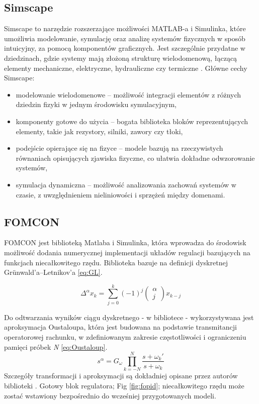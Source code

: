 \documentclass[journal,twoside,web]{ieeecolor}
\begin{document}
\subsection{Simscape}
Simscape to narzędzie rozszerzające możliwości MATLAB-a i Simulinka, które umożliwia modelowanie, symulację oraz analizę systemów fizycznych w sposób intuicyjny, za pomocą komponentów graficznych. Jest szczególnie przydatne w dziedzinach, gdzie systemy mają złożoną strukturę wielodomenową, łączącą elementy mechaniczne, elektryczne, hydrauliczne czy termiczne \href{https://www.mathworks.com/help/robotics/}{\cite{Simscape}}. Główne cechy Simscape:
\begin{itemize}
	\item modelowanie wielodomenowe – możliwość integracji elementów z różnych dziedzin fizyki w jednym środowisku symulacyjnym,
	\item komponenty gotowe do użycia – bogata biblioteka bloków reprezentujących elementy, takie jak rezystory, silniki, zawory czy tłoki,
	\item podejście opierające się na fizyce – modele bazują na rzeczywistych równaniach opisujących zjawiska fizyczne, co ułatwia dokładne odwzorowanie systemów,
	\item symulacja dynamiczna – możliwość analizowania zachowań systemów w czasie, z uwzględnieniem nieliniowości i sprzężeń między domenami.
\end{itemize}
\subsection{FOMCON}
FOMCON jest biblioteką Matlaba i Simulinka, która wprowadza do środowisk możliwość dodania numerycznej implementacji układów regulacji bazujących na funkcjach niecałkowitego rzędu. Biblioteka bazuje na definicji dyskretnej Grünwald'a–Letnikov'a \eqref{eq:GL}.

\begin{equation}
	\Delta ^{\alpha}x_{k} = \sum_{j=0}^{k}(-1)^{j}\left( 
	\begin{matrix}
		\alpha \\
		j
	\end{matrix}\right) x_{k-j}
	\label{eq:GL}
\end{equation}

Do odtwarzania wyników ciągu dyskretnego - w bibliotece - wykorzystywana jest aproksymacja Oustaloupa, która jest budowana na podstawie transmitancji operatorowej rachunku, w zdefiniowanym zakresie częstotliwości i ograniczeniu pamięci próbek \textit{N} \eqref{eq:Oustaloup}.
\begin{equation}
	s^{\alpha} = G_{\omega} \prod_{k=-N}^{N}\frac{s + \omega_{k}'}{s + \omega_{k}}
	\label{eq:Oustaloup}
\end{equation}
Szczegóły transformacji i aproksymacji są dokładniej opisane przez autorów biblioteki \cite{FOMCON,FOMCONdoc}. Gotowy blok regulatora; Fig \ref{fig:fopid}; niecałkowitego rzędu może zostać wstawiony bezpośrednio do wcześniej przygotowanych modeli.
\end{document}
